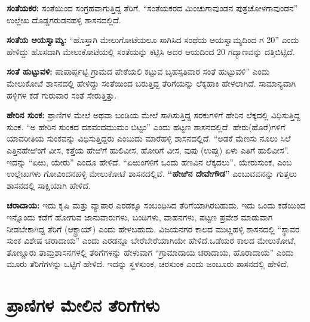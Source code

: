 \textbf{ಸಂತೆಯಕರ:} ಸಂತೆಯಿಂದ ಸಂಗ್ರಹವಾಗುತ್ತಿದ್ದ ತೆರಿಗೆ. “ಸಂತೆಯಕರದ ಮಿಂಚುಗಾವುಂಡನ ಪುತ್ರ\break ಚೋಳಗಾವುಂಡನ” ಉಲ್ಲೇಖ ದೊಡ್ಡಗರುಡನಹಳ್ಳಿ ಶಾಸನದಲ್ಲಿದೆ.

\textbf{ಸಂತೆಯ ಆಯಸ್ವಾಮ್ಯ:} “ಹೊಸ್ತಾಗಿ ಮೇಲುಗೋಟೆಯಲೂ ಸಾಗಿಸಿದ ಸಂಥೆಯ ಆಯಸ್ವಾಮ್ಯದಿಂದ ಗ 20” ಎಂದು ಹೇಳಿದ್ದು ಹೊಸದಾಗಿ ಮೇಲುಕೋಟೆಯಲ್ಲಿ ಸಂತೆಯನ್ನು ಕಟ್ಟಿಸಿ ಅದರ ಆಯದಿಂದ 20 ಗದ್ಯಾಣವನ್ನು ದತ್ತಿಬಿಟ್ಟಿದೆ.

\textbf{ಸಂತೆ ಹುಟ್ಟುವಳಿ:} ಪಾಪಾರ್ಪ್ಪಟ್ಟಿ ಗ್ರಾಮದ ಪೇಠೆಯಲಿ ಕಟ್ಟುವ ಬೃಹಸ್ಪತಿವಾರ ಸಂತೆ ಹುಟ್ಟುವಳಿ” ಎಂದು ಮೇಲುಕೋಟೆ ಶಾಸನದಲ್ಲಿ ಹೇಳಿದ್ದು ಸಂತೆಯಿಂದ ಬರುತ್ತಿದ್ದ ತೆರಿಗೆಯನ್ನು ಲೆಕ್ಕಹಾಕಿ ಹೇಳಲಾಗಿದೆ. ಸಾಮಾನ್ಯವಾಗಿ ಹಳ್ಳಿಗಳ ಕಡೆ ಗುರುವಾರ ಸಂತೆ ಸೇರುತ್ತಿತ್ತು.

\textbf{ಹೇರಿನ ಸುಂಕ:} ಪ್ರಾಣಿಗಳ ಮೇಲೆ ಅಥವಾ ಬಂಡಿಯ ಮೇಲೆ ಸಾಗಿಸುತ್ತಿದ್ದ ಸರಕುಗಳಿಗೆ ಹೇರಿನ ಲೆಕ್ಕದಲ್ಲಿ ವಿಧಿಸುತ್ತಿದ್ದ ಸುಂಕ. “ಅ ಹೇರಿನ ಸುಂಕದ ದಶವಂದಮುಮಂ ಬಿಟ್ಟಂ” ಎಂದು ಹಟ್ಟಣ ಶಾಸನದಲ್ಲಿದೆ. ಹೇರು(ಹೊರೆ)ಗಳಿಗೆ ಯಾವರೀತಿಯ ಸುಂಕವನ್ನು ವಿಧಿಸುತ್ತಿದ್ದರು ಎಂಬುದು ಮಾರೆಹಳ್ಳಿ ಶಾಸನದಲ್ಲಿದೆ. “ಅಡಕೆ ಮೆಣಸು ನೂಲು ಸಿಲೆ ಎತ್ತಿನಹೇಱಿಂಗೆ ವೀಸ, ಕತ್ತೆಯ ಹೇಱಿಗೆ ಹುಲಿವೀಸ, ಹೋರಿಗೆ ವೀಸ, ವುಪು (ಉಪ್ಪು) ಏಳು ಎತಿಗೆ ಹುಲಿವೀಸ”. ಇದನ್ನು “ಏಱು, ಯೇರು” ಎಂದೂ ಹೇಳಿದೆ. “ಏಱುಂಗಳಿಗೆ ಒಂದು ಹಣವಿನ ಲೆಕ್ಕದಲು”, ಯೇರುಸುಂಕ, ಎಂಬ ಉಲ್ಲೇಖಗಳು ಗೋವಿಂದನಹಳ್ಳಿ ಮೇಲುಕೋಟೆ ಶಾಸನದಲ್ಲಿವೆ. \textbf{“ಹೇಱಿನ ದೇವೇಗೌಡ”} ಎಂಬುವವನನ್ನು ಗುತ್ತಲು ಶಾಸನದಲ್ಲಿ ಸಾಕ್ಷಿಯಾಗಿ ಹೇಳಿದೆ.

\textbf{ಚರಾದಾಯ:} ಇದು ಕೃಷಿ ಮತ್ತು ವ್ಯಾಪಾರ ಎರಡಕ್ಕೂ ಸಂಬಂಧಿಸಿದ ತೆರಿಗೆಯಾಗಿರಬಹುದು. ಇದು ಒಂದು ಕಡೆಯಿಂದ ಇನ್ನೊಂದು ಕಡೆಗೆ ಹೋಗುವ ಜಾನುವಾರುಗಳು, ಬಂಡಿಗಳು, ವಾಹನಗಳು, ಪಟ್ಟಣ ಪ್ರವೇಶ ಮಾಡುವಾಗ ನೀಡಬೇಕಾಗಿದ್ದ ತೆರಿಗೆ (ಆಕ್ಟ್ರಾಯ್​) ಎಂದು ಹೇಳಬಹುದು. ವಿಜಯನಗರ ಕಾಲದ ಮುಟ್ಣಹಳ್ಳಿ ಶಾಸನದಲ್ಲಿ “ಸ್ಥಾವರ ಸುಂಕ ವಿಶೇಷ ಚರಾದಾಯ” ಎಂದು ಎರಡನ್ನೂ ಬೇರೆಬೇರೆಯಾಗಿಯೇ ಹೇಳಿದೆ.ಒಡೆಯರ ಕಾಲದ ಮೇಲುಕೋಟೆ, ತೊಣ್ಣೂರು ತಾಮ್ರಶಾಸನಗಳಲ್ಲಿ ತೆರಿಗೆಗಳನ್ನು ಹೇಳುವಾಗ “ಗ್ರಾಮಾದಾಯ ಚರಾದಾಯ, ಹೊರಾದಾಯ” ಎಂದು ಮೂರು ತೆರಿಗೆಗಳನ್ನು ಒಟ್ಟಿಗೆ ಹೇಳಿದೆ. ಇದನ್ನು ಸ್ಥಳಸುಂಕ, ಚರಸುಂಕ ಎಂದು ಜಂಬೂರು ಶಾಸನದಲ್ಲಿ ಹೇಳಿದೆ.

\section{ಪ್ರಾಣಿಗಳ ಮೇಲಿನ ತೆರಿಗೆಗಳು}

